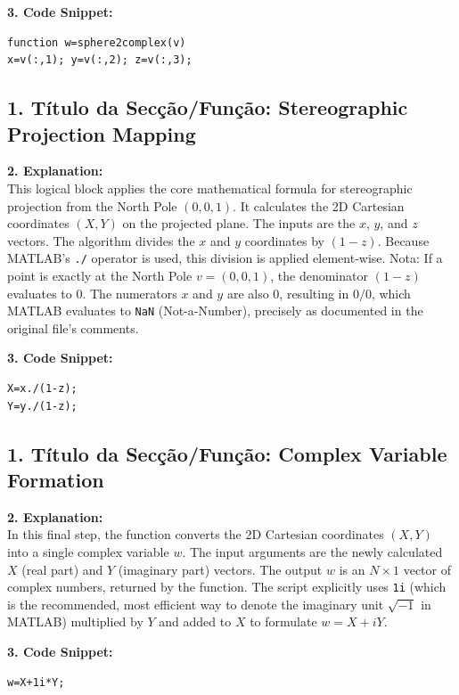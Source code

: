 \textbf{3. Code Snippet:}
\begin{lstlisting}
function w=sphere2complex(v)
x=v(:,1); y=v(:,2); z=v(:,3);
\end{lstlisting}

\vspace{1em}

\subsection*{1. Título da Secção/Função: Stereographic Projection Mapping}
\textbf{2. Explanation:} \\
This logical block applies the core mathematical formula for stereographic projection from the North Pole $(0,0,1)$. It calculates the 2D Cartesian coordinates $(X, Y)$ on the projected plane. The inputs are the $x$, $y$, and $z$ vectors. The algorithm divides the $x$ and $y$ coordinates by $(1 - z)$. Because MATLAB's \texttt{./} operator is used, this division is applied element-wise. 
Nota: If a point is exactly at the North Pole $v = (0, 0, 1)$, the denominator $(1 - z)$ evaluates to $0$. The numerators $x$ and $y$ are also $0$, resulting in $0/0$, which MATLAB evaluates to \texttt{NaN} (Not-a-Number), precisely as documented in the original file's comments.

\textbf{3. Code Snippet:}
\begin{lstlisting}
X=x./(1-z);
Y=y./(1-z);
\end{lstlisting}

\vspace{1em}

\subsection*{1. Título da Secção/Função: Complex Variable Formation}
\textbf{2. Explanation:} \\
In this final step, the function converts the 2D Cartesian coordinates $(X, Y)$ into a single complex variable $w$. The input arguments are the newly calculated $X$ (real part) and $Y$ (imaginary part) vectors. The output $w$ is an $N \times 1$ vector of complex numbers, returned by the function. The script explicitly uses \texttt{1i} (which is the recommended, most efficient way to denote the imaginary unit $\sqrt{-1}$ in MATLAB) multiplied by $Y$ and added to $X$ to formulate $w = X + iY$.

\textbf{3. Code Snippet:}
\begin{lstlisting}
w=X+1i*Y;
\end{lstlisting}

